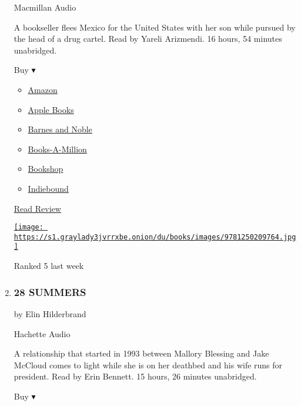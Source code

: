 \begin{enumerate}
  Macmillan Audio

  A bookseller flees Mexico for the United States with her son while
  pursued by the head of a drug cartel. Read by Yareli Arizmendi. 16
  hours, 54 minutes unabridged.

  Buy ▾

  \begin{itemize}
  \tightlist
  \item
    \href{https://www.amazon.com/American-Dirt-Oprahs-Book-Club/dp/1250209765?tag=NYTBS-20}{Amazon}
  \item
    \href{https://du-gae-books-dot-nyt-du-prd.appspot.com/buy?title=AMERICAN+DIRT\&author=Jeanine+Cummins}{Apple
    Books}
  \item
    \href{https://www.anrdoezrs.net/click-7990613-11819508?url=https\%3A\%2F\%2Fwww.barnesandnoble.com\%2Fw\%2F\%3Fean\%3D9781250260604}{Barnes
    and Noble}
  \item
    \href{https://www.anrdoezrs.net/click-7990613-35140?url=https\%3A\%2F\%2Fwww.booksamillion.com\%2Fp\%2FAMERICAN\%2BDIRT\%2FJeanine\%2BCummins\%2F9781250260604}{Books-A-Million}
  \item
    \href{https://bookshop.org/a/3546/9781250260604}{Bookshop}
  \item
    \href{https://www.indiebound.org/book/9781250260604?aff=NYT}{Indiebound}
  \end{itemize}

  \href{https://www.nytimes3xbfgragh.onion/2020/01/17/books/review-american-dirt-jeanine-cummins.html}{Read
  Review}

  \href{https://www.nytimes3xbfgragh.onion/2020/01/17/books/review-american-dirt-jeanine-cummins.html}{\texttt{[image: https://s1.graylady3jvrrxbe.onion/du/books/images/9781250209764.jpg]}}

  Ranked 5 last week
\item
  \hypertarget{28-summers}{%
  \subsubsection{28 SUMMERS}\label{28-summers}}

  by Elin Hilderbrand

  Hachette Audio

  A relationship that started in 1993 between Mallory Blessing and Jake
  McCloud comes to light while she is on her deathbed and his wife runs
  for president. Read by Erin Bennett. 15 hours, 26 minutes unabridged.

  Buy ▾


\end{enumerate}
